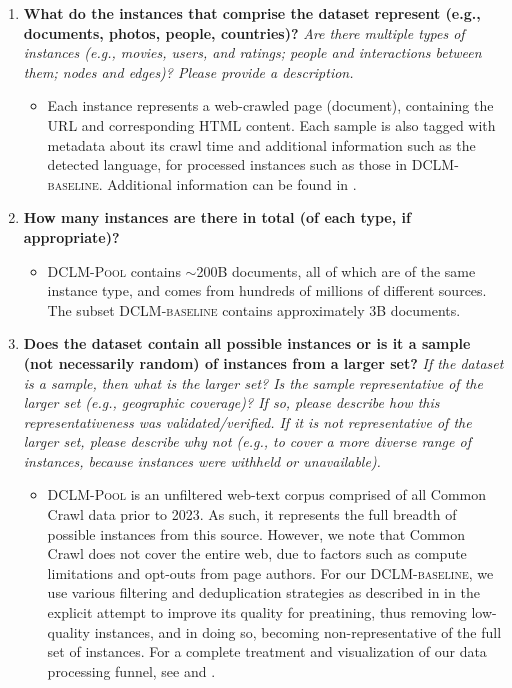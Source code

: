 \documentclass{article}
\newcommand{\rawpool}{\textsc{DCLM-Pool}\xspace}
\newcommand{\hqpool}{\textsc{DCLM-baseline}\xspace}
\newcommand{\commoncrawl}{Common Crawl\xspace}
\begin{document}
\begin{enumerate}[label=Q\arabic*, resume]

\item \textbf{What do the instances that comprise the dataset represent (e.g., documents, photos, people, countries)?} \textit{Are there multiple types of instances (e.g., movies, users, and ratings; people and interactions between them; nodes and edges)? Please provide a description.}

\begin{itemize}
\item Each instance represents a web-crawled page (document), containing the URL and corresponding HTML content. Each sample is also tagged with metadata about its crawl time and additional information such as the detected language, for processed instances such as those in \hqpool.
Additional information can be found in .
\end{itemize}

\item \textbf{How many instances are there in total (of each type, if appropriate)?}

\begin{itemize}
\item \rawpool contains $\sim$200B documents, all of which are of the same instance type, and comes from hundreds of millions of different sources. The subset \hqpool contains approximately 3B documents.
\end{itemize}

\item \textbf{Does the dataset contain all possible instances or is it a sample (not necessarily random) of instances from a larger set?} \textit{If the dataset is a sample, then what is the larger set? Is the sample representative of the larger set (e.g., geographic coverage)? If so, please describe how this representativeness was validated/verified.
If it is not representative of the larger set, please describe why not (e.g., to cover a more diverse range of instances, because instances were withheld or unavailable).}

\begin{itemize}
\item \rawpool is an unfiltered web-text corpus comprised of all \commoncrawl data prior to 2023. As such, it represents the full breadth of possible instances from this source. However, we note that \commoncrawl does not cover the entire web, due to factors such as compute limitations and opt-outs from page authors.
For our \hqpool, we use various filtering and deduplication strategies as described in  in the explicit attempt to improve its quality for preatining, thus removing low-quality instances, and in doing so, becoming non-representative of the full set of instances.
For a complete treatment and visualization of our data processing funnel, see  and .
\end{itemize}


\end{enumerate}
\end{document}

